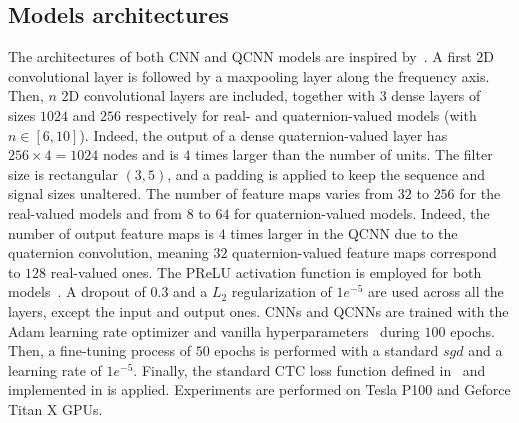 \documentclass[a4paper]{article}
\begin{document}
\subsection{Models architectures}
\label{sec:model}
The architectures of both CNN and QCNN models are inspired by~\cite{zhang2017towards}. A first $2$D convolutional layer is followed by a maxpooling layer along the frequency axis. Then, $n$ $2$D convolutional layers are included, together with $3$ dense layers of sizes $1024$ and $256$ respectively for real- and quaternion-valued models (with $n\in[6,10]$). Indeed, the output of a dense quaternion-valued layer has $256 \times 4 = 1024$ nodes and is $4$ times larger than the number of units.
The filter size is rectangular $(3,5)$, and a padding is applied to keep the sequence and signal sizes unaltered. The number of feature maps varies from $32$ to $256$ for the real-valued models and from $8$ to $64$ for quaternion-valued models. Indeed, the number of output feature maps is $4$ times larger in the QCNN due to the quaternion convolution, meaning $32$ quaternion-valued feature maps correspond to $128$ real-valued ones. The PReLU activation function is employed for both models~\cite{he2015delving}. A dropout of $0.3$ and a $L_2$ regularization of $1e^{-5}$ are used across all the layers, except the input and output ones. CNNs and QCNNs are trained with the Adam learning rate optimizer and vanilla hyperparameters~\cite{kingma2014adam} during $100$ epochs. Then, a fine-tuning process of $50$ epochs is performed with a standard $sgd$ and a learning rate of $1e^{-5}$. Finally, the standard CTC loss function defined in~\cite{graves2006connectionist} and implemented in \cite{chollet2015keras} is applied. Experiments are performed on Tesla P100 and Geforce Titan X GPUs. 
\end{document}
